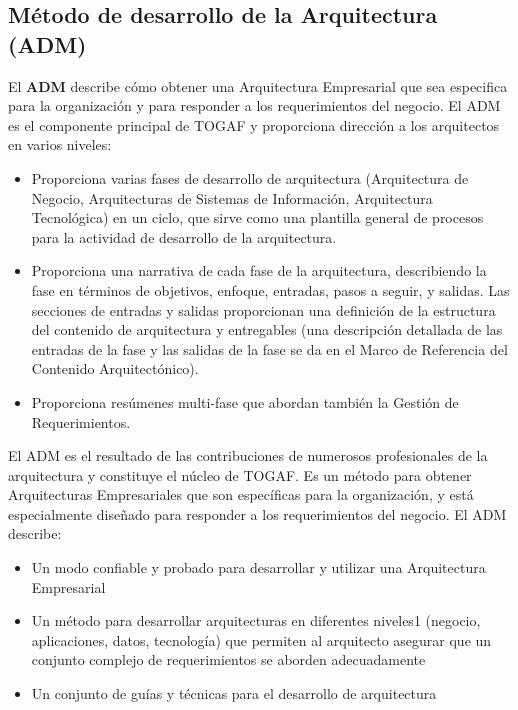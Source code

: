   \subsection{Método de desarrollo de la Arquitectura (ADM)}
  El \textbf{ADM} describe cómo obtener una Arquitectura Empresarial que sea especifica para la organización y para responder a los requerimientos del negocio. El ADM es el componente principal de TOGAF y proporciona dirección a los arquitectos en varios niveles:
  \begin{itemize}
  	\item Proporciona varias fases de desarrollo de arquitectura (Arquitectura de Negocio, Arquitecturas de Sistemas de Información, Arquitectura Tecnológica) en un ciclo, que sirve como una plantilla general de procesos para la actividad de desarrollo de la arquitectura.
  	\item Proporciona una narrativa de cada fase de la arquitectura, describiendo la fase en términos de objetivos, enfoque, entradas, pasos a seguir, y salidas. Las secciones de entradas y salidas proporcionan una definición de la estructura del contenido de arquitectura y entregables (una descripción detallada de las entradas de la fase y las salidas de la fase se da en el Marco de Referencia del Contenido Arquitectónico).
  	\item Proporciona resúmenes multi-fase que abordan también la Gestión de Requerimientos.
  \end{itemize}
  
  El ADM es el resultado de las contribuciones de numerosos profesionales de la arquitectura y constituye el núcleo de TOGAF. Es un método para obtener Arquitecturas Empresariales que son específicas para la organización, y está especialmente diseñado para responder a los requerimientos del negocio. El ADM describe:
  
  \begin{itemize}
  	\item Un modo confiable y probado para desarrollar y utilizar una Arquitectura Empresarial
  	\item Un método para desarrollar arquitecturas en diferentes niveles1 (negocio, aplicaciones, datos, tecnología) que permiten al arquitecto asegurar que un conjunto complejo de requerimientos se aborden adecuadamente
  	\item Un conjunto de guías y técnicas para el desarrollo de arquitectura
 \end{itemize}
  
